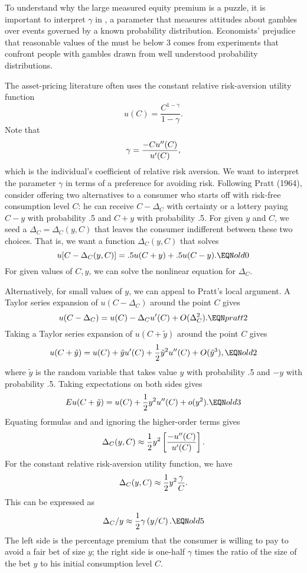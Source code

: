     To  understand why
the large measured equity premium is a puzzle, it is important to interpret $\gamma$ in ,
a parameter that measures attitudes about gambles over events governed by a known probability distribution.
 Economists' prejudice that reasonable values
of the  must be below 3
comes from experiments that confront people with gambles drawn from well understood probability distributions.

The asset-pricing literature
often uses the constant relative risk-aversion utility function
$$ u(C) = {\frac{C^{1-\gamma}}{1-\gamma}}.$$
Note that
$$ \gamma = {- C u''(C) \over u'(C) },$$
which is the individual's coefficient of relative risk aversion.
  We want to interpret the parameter $\gamma$ in terms of a preference
for avoiding risk.   Following Pratt (1964), consider
 offering  two alternatives to a
 consumer who starts off with risk-free consumption
level $C$: he can receive $C - \Delta_C$ with certainty
or  a lottery paying $C - y$ with probability .5 and $C+y$ with probability
.5.   For given   $y$  and $C$, we seed a  $\Delta_C = \Delta_C(y,C)$ that leaves the consumer
indifferent between these two choices.  That is, we want
a function $\Delta_C(y,C)$ that solves
$$ u[C - \Delta_C(y,C)] = .5 u(C+y) + .5 u(C-y). \EQN old0 $$
  For given  values of $C,y$, we can solve the nonlinear
equation  for $\Delta_C$.

Alternatively, for small values of $y$, we can appeal to
Pratt's local  argument.    A Taylor series
expansion of $u(C - \Delta_C)$ around the point $C$ gives
$$ u(C -\Delta_C) = u(C) - \Delta_C u'(C) + O(\Delta_C^2) . \EQN pratt2$$
 Taking a Taylor series expansion
of $u(C+\tilde y) $ around the point $C$ gives
$$ u(C+\tilde y)   = u(C) + \tilde y u'(C) +  {1 \over 2}
         \tilde y^2 u''(C) + O(\tilde y^3) , \EQN old2$$
where $\tilde y$ is the random variable that takes
value $y$ with probability .5 and $-y$ with probability .5.
Taking expectations  on both sides gives
$$ Eu(C+\tilde y) = u(C) + { 1\over 2} y^2 u''(C) + o(y^2). \EQN old3 $$
Equating formulas
  and  and ignoring the  higher-order terms gives
$$ \Delta_C(y,C) \approx {1 \over 2} y^2 \left[{ - u''(C) \over u'(C)}\right] .$$
For the constant relative risk-aversion
utility function, we have
$$ \Delta_C(y,C) \approx {1 \over 2} y^2 {\gamma \over C}.  $$
This can be expressed
as
$$ \Delta_C / y \approx {1 \over 2} \gamma \left(y / C \right) . \EQN old5 $$
The left side is the percentage premium that the consumer is willing
to pay to avoid a fair bet     of size $y$; the right
side is one-half $\gamma$ times the ratio of the size of the
bet $y$ to his initial consumption level $C$.



